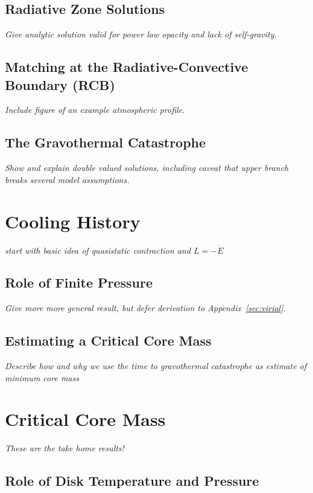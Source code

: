 \documentclass[12pt, preprint,numberedappendix]{emulateapj}
\newcommand{\App}[1]{Appendix~\ref{#1}}
\newcommand{\emgr}[1]{\emph{ \color{gray} #1}}
\begin{document}

\subsection{Radiative Zone Solutions}
\emgr{Give analytic solution valid for power law opacity and lack of self-gravity.}

\subsection{Matching at the Radiative-Convective Boundary (RCB)}
\emgr{Include figure of an example atmospheric profile.}

\subsection{The Gravothermal Catastrophe}
\emgr{Show and explain double valued solutions, including caveat that upper branch breaks several model assumptions.}

\section{Cooling History}
\emgr{start with basic idea of quasistatic contraction and $L = -\dot{E}$}
\subsection{Role of Finite Pressure}
 \emgr{Give more more general result, but defer derivation to \App{sec:virial}.}
\subsection{Estimating a Critical Core Mass}
\emgr{Describe how and why we use the time to gravothermal catastrophe as estimate of minimum core mass}

\section{Critical Core Mass}
\emgr{These are the take home results!}

\subsection{Role of Disk Temperature and Pressure}
\end{document}
